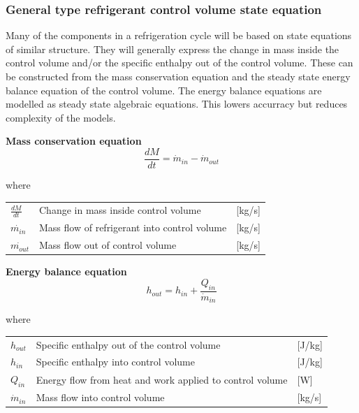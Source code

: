 \subsubsection{General type refrigerant control volume state equation}
Many of the components in a refrigeration cycle will be based on state equations of similar structure. They will generally express the change in mass inside the control volume and/or the specific enthalpy out of the control volume. These can be constructed from the mass conservation equation and the steady state energy balance equation of the control volume. The energy balance equations are modelled as steady state algebraic equations. This lowers accurracy but reduces complexity of the models.

\textbf{Mass conservation equation} \\
\begin{equation} \label{eq:GeneralTypeControlVol_MassConservation}
	\frac{dM}{dt} = \dot{m}_{in} - \dot{m}_{out}
\end{equation}

where
\begin{center}
	\begin{tabular}{l p{8cm} l}
		$\frac{dM}{dt}$ 	& Change in mass inside control volume & [\si{kg}/\si{s}]\\
		$\dot{m_{in}}$ 		& Mass flow of refrigerant into control volume & [\si{kg}/\si{s}]\\
		$\dot{m_{out}}$ 	& Mass flow out of control volume & [\si{kg}/\si{s}]\\
	\end{tabular}
\end{center}

\textbf{Energy balance equation}
\begin{equation}
	h_{out} = h_{in} + \frac{Q_{in}}{\dot{m}_{in}}
\end{equation}

where
\begin{center}
	\begin{tabular}{l p{8cm} l}
		$h_{out}$ 		& Specific enthalpy out of the control volume & [\si{J}/\si{kg}]\\
		$h_{in}$ 		& Specific enthalpy into control volume & [\si{J}/\si{kg}]\\
		$Q_{in}$ 		& Energy flow from heat and work applied to control volume & [\si{W}]\\
		$\dot{m}_{in}$ 	& Mass flow into control volume & [\si{kg}/\si{s}]\\
	\end{tabular}
\end{center}

